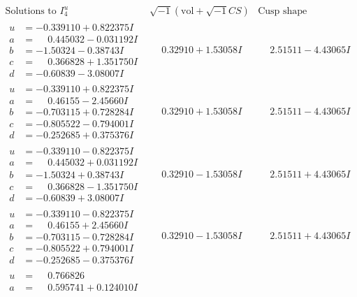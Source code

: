 \documentclass[1p]{elsarticle_modified}
\theoremstyle{definition}
\newcommand{\I}{\sqrt{-1}}
\begin{document}
$$\begin{array}{c|c|c}  
\text{Solutions to }I^u_{4}& \I (\text{vol} + \sqrt{-1}CS) & \text{Cusp shape}\\
 \hline 
\begin{aligned}
u &= -0.339110 + 0.822375 I \\
a &= \phantom{-}0.445032 - 0.031192 I \\
b &= -1.50324 - 0.38743 I \\
c &= \phantom{-}0.366828 + 1.351750 I \\
d &= -0.60839 - 3.08007 I\end{aligned}
 & \phantom{-}0.32910 + 1.53058 I & \phantom{-}2.51511 - 4.43065 I \\ \hline\begin{aligned}
u &= -0.339110 + 0.822375 I \\
a &= \phantom{-}0.46155 - 2.45660 I \\
b &= -0.703115 + 0.728284 I \\
c &= -0.805522 - 0.794001 I \\
d &= -0.252685 + 0.375376 I\end{aligned}
 & \phantom{-}0.32910 + 1.53058 I & \phantom{-}2.51511 - 4.43065 I \\ \hline\begin{aligned}
u &= -0.339110 - 0.822375 I \\
a &= \phantom{-}0.445032 + 0.031192 I \\
b &= -1.50324 + 0.38743 I \\
c &= \phantom{-}0.366828 - 1.351750 I \\
d &= -0.60839 + 3.08007 I\end{aligned}
 & \phantom{-}0.32910 - 1.53058 I & \phantom{-}2.51511 + 4.43065 I \\ \hline\begin{aligned}
u &= -0.339110 - 0.822375 I \\
a &= \phantom{-}0.46155 + 2.45660 I \\
b &= -0.703115 - 0.728284 I \\
c &= -0.805522 + 0.794001 I \\
d &= -0.252685 - 0.375376 I\end{aligned}
 & \phantom{-}0.32910 - 1.53058 I & \phantom{-}2.51511 + 4.43065 I \\ \hline\begin{aligned}
u &= \phantom{-}0.766826\phantom{ +0.000000I} \\
a &= \phantom{-}0.595741 + 0.124010 I \\

\end{aligned}
\end{array}$$
\end{document}
